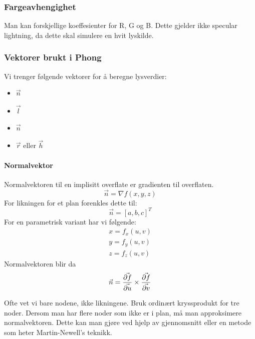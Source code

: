 \subsubsection{Fargeavhengighet}
Man kan forskjellige koeffesienter for R, G og B. Dette gjelder ikke specular lightning, da dette skal simulere en hvit lyskilde.

\subsubsection{Vektorer brukt i Phong}
Vi trenger følgende vektorer for å beregne lysverdier:
\begin{itemize}
    \item $\vec{n}$
    \item $\vec{l}$
    \item $\vec{n}$
    \item $\vec{r}$ eller $\vec{h}$
\end{itemize}

\paragraph{Normalvektor}
Normalvektoren til en implisitt overflate er gradienten til overflaten.
\begin{equation}
    \vec{n} = \nabla f(x,y,z)
\end{equation}
For likningen for et plan forenkles dette til:
\begin{equation}
    \vec{n} = [a,b,c]^T
\end{equation}
For en parametrisk variant har vi følgende:
\begin{equation}
    \begin{aligned}
        x = f_x(u,v) \\
        y = f_y(u,v) \\
        z = f_z(u,v)
    \end{aligned}
\end{equation}
Normalvektoren blir da
\begin{equation}
    \vec{n} = {\vec{\partial f} \over \vec{\partial u}} \times
    {\vec{\partial f} \over \vec{\partial v}}
\end{equation}

Ofte vet vi bare nodene, ikke likningene. Bruk ordinært kryssprodukt for tre noder. Dersom man har flere noder som ikke er i plan, må man approksimere normalvektoren. Dette kan man gjøre ved hjelp av gjennomsnitt eller en metode som heter Martin-Newell's teknikk.

